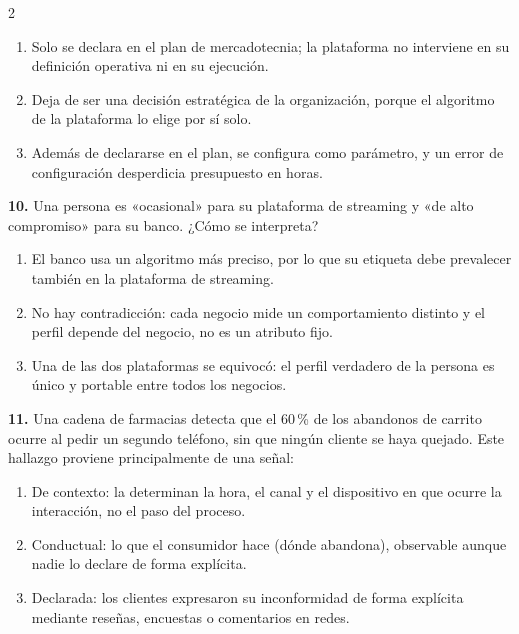 \documentclass[10pt,letterpaper]{article}
\begin{document}
\begin{multicols}{2}
\vspace{-3pt}
\begin{enumerate}[label=\alph*),leftmargin=1.1em,itemsep=0pt,topsep=1pt,parsep=0pt,partopsep=0pt]
\item Solo se declara en el plan de mercadotecnia; la plataforma no interviene en su definición operativa ni en su ejecución.
\item Deja de ser una decisión estratégica de la organización, porque el algoritmo de la plataforma lo elige por sí solo.
\item Además de declararse en el plan, se configura como parámetro, y un error de configuración desperdicia presupuesto en horas.
\end{enumerate}
\vspace{2pt}
\noindent\textbf{10.} Una persona es «ocasional» para su plataforma de streaming y «de alto compromiso» para su banco. ¿Cómo se interpreta?
\vspace{-3pt}
\begin{enumerate}[label=\alph*),leftmargin=1.1em,itemsep=0pt,topsep=1pt,parsep=0pt,partopsep=0pt]
\item El banco usa un algoritmo más preciso, por lo que su etiqueta debe prevalecer también en la plataforma de streaming.
\item No hay contradicción: cada negocio mide un comportamiento distinto y el perfil depende del negocio, no es un atributo fijo.
\item Una de las dos plataformas se equivocó: el perfil verdadero de la persona es único y portable entre todos los negocios.
\end{enumerate}
\vspace{2pt}
\noindent\textbf{11.} Una cadena de farmacias detecta que el 60\,\% de los abandonos de carrito ocurre al pedir un segundo teléfono, sin que ningún cliente se haya quejado. Este hallazgo proviene principalmente de una señal:
\vspace{-3pt}
\begin{enumerate}[label=\alph*),leftmargin=1.1em,itemsep=0pt,topsep=1pt,parsep=0pt,partopsep=0pt]
\item De contexto: la determinan la hora, el canal y el dispositivo en que ocurre la interacción, no el paso del proceso.
\item Conductual: lo que el consumidor hace (dónde abandona), observable aunque nadie lo declare de forma explícita.
\item Declarada: los clientes expresaron su inconformidad de forma explícita mediante reseñas, encuestas o comentarios en redes.

\end{enumerate}
\end{multicols}
\end{document}
